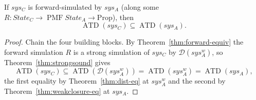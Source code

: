 \begin{theorem}
  \label{thm:forward-sound}
  \leanok
  If $sys_C$ is forward-simulated by $sys_A$ (along some $R : State_C \to \operatorname{PMF} State_A \to \mathrm{Prop}$), then
  \[
    \operatorname{ATD}(sys_C) \subseteq \operatorname{ATD}(sys_A).
  \]
\end{theorem}

\begin{proof}\leanok
  Chain the four building blocks.
  By Theorem~\ref{thm:forward-equiv} the forward simulation $R$ is a strong simulation of $sys_C$ by $\mathcal{D}(sys_A^w)$, so Theorem~\ref{thm:strongsound} gives
  \[
    \operatorname{ATD}(sys_C)
      \subseteq \operatorname{ATD}(\mathcal{D}(sys_A^w))
      = \operatorname{ATD}(sys_A^w)
      = \operatorname{ATD}(sys_A),
  \]
  the first equality by Theorem~\ref{thm:dist-eq} at $sys_A^w$ and the second by Theorem~\ref{thm:weakclosure-eq} at $sys_A$.
\end{proof}
